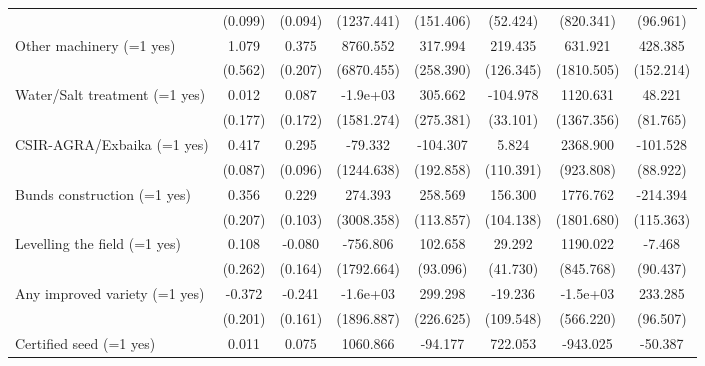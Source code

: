 {\begin{tabular}{l*{7}{c}}
                    &(0.099)         &(0.094)         &(1237.441)         &(151.406)         &(52.424)         &(820.341)         &(96.961)         \\
Other machinery (=1 yes)&1.079         &0.375         &8760.552         &317.994         &219.435         &631.921         &428.385\sym{*}  \\
                    &(0.562)         &(0.207)         &(6870.455)         &(258.390)         &(126.345)         &(1810.505)         &(152.214)         \\
Water/Salt treatment (=1 yes)&0.012         &0.087         &-1.9e+03         &305.662         &-104.978\sym{*}  &1120.631         &48.221         \\
                    &(0.177)         &(0.172)         &(1581.274)         &(275.381)         &(33.101)         &(1367.356)         &(81.765)         \\
CSIR-AGRA/Exbaika (=1 yes)&0.417\sym{**} &0.295\sym{*}  &-79.332         &-104.307         &5.824         &2368.900\sym{*}  &-101.528         \\
                    &(0.087)         &(0.096)         &(1244.638)         &(192.858)         &(110.391)         &(923.808)         &(88.922)         \\
Bunds construction (=1 yes)&0.356         &0.229         &274.393         &258.569         &156.300         &1776.762         &-214.394         \\
                    &(0.207)         &(0.103)         &(3008.358)         &(113.857)         &(104.138)         &(1801.680)         &(115.363)         \\
Levelling the field (=1 yes)&0.108         &-0.080         &-756.806         &102.658         &29.292         &1190.022         &-7.468         \\
                    &(0.262)         &(0.164)         &(1792.664)         &(93.096)         &(41.730)         &(845.768)         &(90.437)         \\
Any improved variety (=1 yes)&-0.372         &-0.241         &-1.6e+03         &299.298         &-19.236         &-1.5e+03\sym{*}  &233.285\sym{*}  \\
                    &(0.201)         &(0.161)         &(1896.887)         &(226.625)         &(109.548)         &(566.220)         &(96.507)         \\
Certified seed (=1 yes)&0.011         &0.075         &1060.866         &-94.177         &722.053\sym{***}&-943.025         &-50.387         \\

\end{tabular}}
